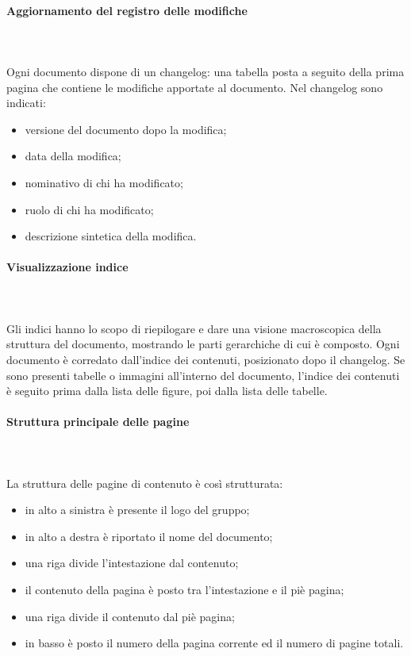 		\paragraph{Aggiornamento del registro delle modifiche} \mbox{}\\ \mbox{}\\
		Ogni documento dispone di un changelog\glo: una tabella posta a seguito della prima pagina che contiene le modifiche apportate al documento. Nel changelog sono indicati:
		\begin{itemize}
			\item versione del documento dopo la modifica;
			\item data della modifica;
			\item nominativo di chi ha modificato;
			\item ruolo di chi ha modificato;
			\item descrizione sintetica della modifica.
		\end{itemize}
		\paragraph{Visualizzazione indice} \mbox{}\\ \mbox{}\\
		Gli indici hanno lo scopo di riepilogare e dare una visione macroscopica della struttura del documento, mostrando le parti gerarchiche di cui è composto.\newline 
		Ogni documento è corredato dall'indice dei contenuti, posizionato dopo il changelog\glo. Se sono presenti tabelle o immagini all'interno del documento, l'indice dei contenuti è seguito prima dalla lista delle figure, poi dalla lista delle tabelle.
		\paragraph{Struttura principale delle pagine} \mbox{}\\ \mbox{}\\
		La struttura delle pagine di contenuto è così strutturata:
		\begin{itemize}
			\item in alto a sinistra è presente il logo del gruppo;
			\item in alto a destra è riportato il nome del documento;
			\item una riga divide l'intestazione dal contenuto;
			\item il contenuto della pagina è posto tra l'intestazione e il piè pagina;
			\item una riga divide il contenuto dal piè pagina;
			\item in basso è posto il numero della pagina corrente ed il numero di pagine totali.
		\end{itemize}		
	
